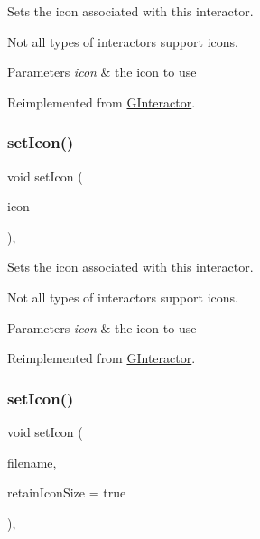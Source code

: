 Sets the icon associated with this interactor. 

Not all types of interactors support icons. 
\begin{DoxyParams}{Parameters}
{\em icon} & the icon to use \\
\hline
\end{DoxyParams}


Reimplemented from \mbox{\hyperlink{classsgl_1_1GInteractor_a542abfcd7261751352af129c7215ecda}{G\+Interactor}}.

\mbox{\label{classsgl_1_1GLabel_acb5275b880ff622d306f8f33428b4e34}} 
\subsubsection{\texorpdfstring{set\+Icon()}{setIcon()}\hspace{0.1cm}{\footnotesize\ttfamily [2/3]}}
{\footnotesize\ttfamily void set\+Icon (\begin{DoxyParamCaption}\item[{const Q\+Pixmap \&}]{icon }\end{DoxyParamCaption})\hspace{0.3cm}{\ttfamily [override]}, {\ttfamily [virtual]}}



Sets the icon associated with this interactor. 

Not all types of interactors support icons. 
\begin{DoxyParams}{Parameters}
{\em icon} & the icon to use \\
\hline
\end{DoxyParams}


Reimplemented from \mbox{\hyperlink{classsgl_1_1GInteractor_a368e1a338f84401c284506d03b1ba769}{G\+Interactor}}.

\mbox{\label{classsgl_1_1GLabel_abbefcb1f611af273755c7e1cca921497}} 
\subsubsection{\texorpdfstring{set\+Icon()}{setIcon()}\hspace{0.1cm}{\footnotesize\ttfamily [3/3]}}
{\footnotesize\ttfamily void set\+Icon (\begin{DoxyParamCaption}\item[{const std\+::string \&}]{filename,  }\item[{bool}]{retain\+Icon\+Size = {\ttfamily true} }\end{DoxyParamCaption})\hspace{0.3cm}{\ttfamily [override]}, {\ttfamily [virtual]}}




